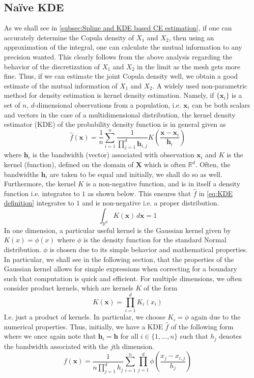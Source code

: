 \documentclass[../Thesis.tex]{subfiles}
\begin{document}
\subsection{Naïve KDE}
As we shall see in \autoref{subsec:Spline and KDE based CE estimation}, if one can accurately determine the Copula density of $X_1$ and $X_2$, then using an approximation of the integral, one can calculate the mutual information to any precision wanted. This clearly follows from the above analysis regarding the behavior of the discretization of $X_1$ and $X_2$ in the limit as the mesh gets more fine. Thus, if we can estimate the joint Copula density well, we obtain a good estimate of the mutual information of $X_1$ and $X_2$. A widely used non-parametric method for density estimation is kernel density estimation. Namely, if $\{{\boldsymbol x}_i\}$ is a set of $n$, $d$-dimensional observations from a population, i.e. $\boldsymbol x_i$ can be both scalars and vectors in the case of a multidimensional distribution, the kernel density estimator (KDE) of the probability density function is in general given as
\begin{equation}\label{eq:KDE definition}
    \hat{f}(\boldsymbol x) = \frac{1}{n}\sum_{i=1}^n \frac{1}{\prod_{j= 1}^d \boldsymbol h_{i,j}} K\left(\frac{\boldsymbol x-\boldsymbol x_i}{\boldsymbol h_i}\right)
\end{equation}
where $\boldsymbol h_i$ is the bandwidth (vector) associated with observation $\boldsymbol x_i$ and $K$ is the kernel (function), defined on the domain of $\boldsymbol X$ which is often $\mathbb{R}^d$. Often, the bandwidths $\boldsymbol h_i$ are taken to be equal and initially, we shall do so as well. Furthermore, the kernel $K$ is a non-negative function, and is in itself a density function i.e. integrates to $1$ as shown below. This ensures that $\hat{f}$ in \autoref{eq:KDE definition} integrates to $1$ and is non-negative i.e. a proper distribution.
$$\int_{\mathbb{R}^d} K(\boldsymbol x) \, d\boldsymbol x = 1$$
In one dimension, a particular useful kernel is the Gaussian kernel given by $K(x) = \phi\left(x\right)$ where $\phi$ is the density function for the standard Normal distribution. $\phi$ is chosen due to its simple behavior and mathematical properties. In particular, we shall see in the following section, that the properties of the Gaussian kernel allows for simple expressions when correcting for a boundary such that computation is quick and efficient. For multiple dimensions, we often consider product kernels, which are kernels $K$ of the form
\begin{equation}\label{eq:product kernel}
    K\left(\boldsymbol x\right) = \prod_{i = 1}^{d} K_i\left(x_i\right)
\end{equation}
I.e. just a product of kernels. In particular, we choose $K_i = \phi$ again due to the numerical properties. Thus, initially, we have a KDE $\hat{f}$ of the following form where we once again note that $\boldsymbol h_i = \boldsymbol h$ for all $i\in \{1,\dots, n\}$ such that $h_j$ denotes the bandwidth associated with the $j$th dimension.
$$\hat{f}\left(\boldsymbol x\right) = \frac{1}{n\prod_{j = 1}^{d}h_j} \sum_{i=1}^n \prod_{j = 1}^{d} \phi \left(\frac{x_j - x_{i,j}}{h_j}\right)$$
\end{document}
